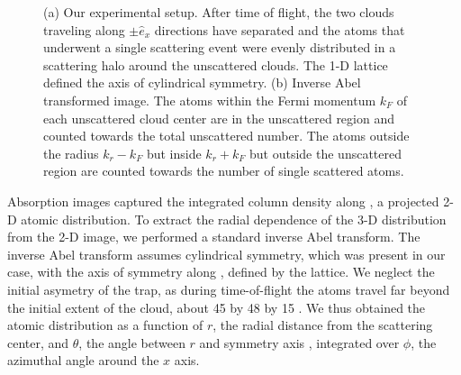 \documentclass[12pt]{iopart}
\begin{document}
\begin{figure}
\caption{(a) Our experimental setup. After time of flight, the two clouds traveling along $\pm \hat{e}_x$ directions have separated and the atoms that underwent a single scattering event were evenly distributed in a scattering halo around the unscattered clouds. The 1-D lattice defined the axis of cylindrical symmetry. (b) Inverse Abel transformed image. The atoms within the Fermi momentum $k_F$ of each unscattered cloud center are in the unscattered region and counted towards the total unscattered number. The atoms outside the radius $k_r-k_F$ but inside $k_r+k_F$ but outside the unscattered region are counted towards the number of single scattered atoms.   }
\label{fig:halo}
\end{figure}
\par Absorption images captured the integrated column density along \ez{}, a projected 2-D atomic distribution. To extract the radial dependence of the 3-D distribution from the 2-D image, we performed a standard inverse Abel transform. The inverse Abel transform assumes cylindrical symmetry, which was present in our case, with the axis of symmetry along \ex{}, defined by the lattice. We neglect the initial asymetry of the trap, as during time-of-flight the atoms travel far beyond the initial extent of the cloud, about 45 by 48 by 15 \um{}. We thus obtained the atomic distribution as a function of $r$, the radial distance from the scattering center, and $\theta$, the angle between $r$ and symmetry axis \ex{}, integrated over $\phi$, the azimuthal angle around the $x$ axis.
\end{document}
